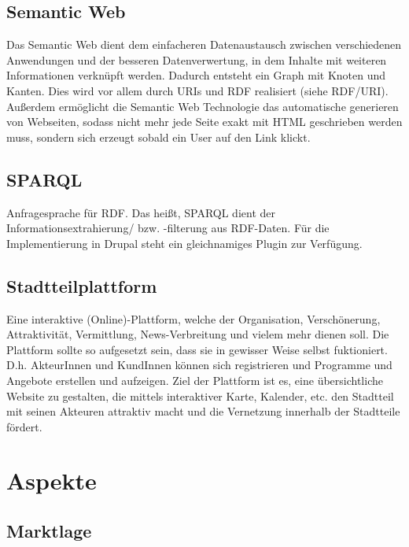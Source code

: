 \documentclass{swp}
\begin{document}
\subsection{Semantic Web}
Das Semantic Web dient dem einfacheren Datenaustausch zwischen verschiedenen Anwendungen und der besseren Datenverwertung, in dem Inhalte mit weiteren Informationen verkn\"upft werden. Dadurch entsteht ein Graph mit Knoten und Kanten. Dies wird vor allem durch URIs und RDF realisiert (siehe RDF/URI). Au{\ss}erdem erm\"oglicht die Semantic Web Technologie das automatische generieren von Webseiten, sodass nicht mehr jede Seite exakt mit HTML geschrieben werden muss, sondern sich erzeugt sobald ein User auf den Link klickt.
\subsection{SPARQL}
Anfragesprache f\"ur RDF. Das hei{\ss}t, SPARQL dient der Informationsextrahierung/ bzw. -filterung aus RDF-Daten. F\"ur die Implementierung in Drupal steht ein gleichnamiges Plugin zur Verf\"ugung.
\subsection{Stadtteilplattform}
Eine interaktive (Online)-Plattform, welche der Organisation, Versch\"onerung, Attraktivit\"at, Vermittlung, \glqq News-Verbreitung\grqq{} und vielem mehr dienen soll. Die Plattform sollte so aufgesetzt sein, dass sie in gewisser Weise selbst fuktioniert. D.h. AkteurInnen und KundInnen k\"onnen sich registrieren und Programme und Angebote erstellen und aufzeigen. Ziel der Plattform ist es, eine \"ubersichtliche Website zu gestalten, die mittels interaktiver Karte, Kalender, etc. den Stadtteil mit seinen Akteuren attraktiv macht und die Vernetzung innerhalb der Stadtteile f\"ordert.

\section{Aspekte}
\subsection{Marktlage}
\end{document}
